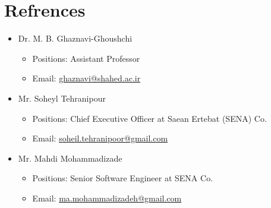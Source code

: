 \documentclass[10pt,a4paper,sans]{moderncv} %
\begin{document}
	\section{Refrences}
	\begin{itemize}
    	\item Dr. M. B. Ghaznavi-Ghoushchi
    	\begin{itemize}
    		\item Positions: Assistant Professor
    		\item Email: \href{mailto:ghaznavi@shahed.ac.ir}{ghaznavi@shahed.ac.ir}
    	\end{itemize}
    	\item Mr. Soheyl Tehranipour
    	\begin{itemize}
    		\item Positions: Chief Executive Officer at Saean Ertebat (SENA) Co.
    		\item Email: \href{mailto:soheil.tehranipoor@gmail.com}{soheil.tehranipoor@gmail.com}
    	\end{itemize}    	
    	\item Mr. Mahdi Mohammadizade
    	\begin{itemize}
    		\item Positions: Senior Software Engineer at SENA Co.
    		\item Email: \href{mailto:ma.mohammadizadeh@gmail.com}{ma.mohammadizadeh@gmail.com}
    	\end{itemize}    
	\end{itemize}
	
	


	
	
\end{document}
